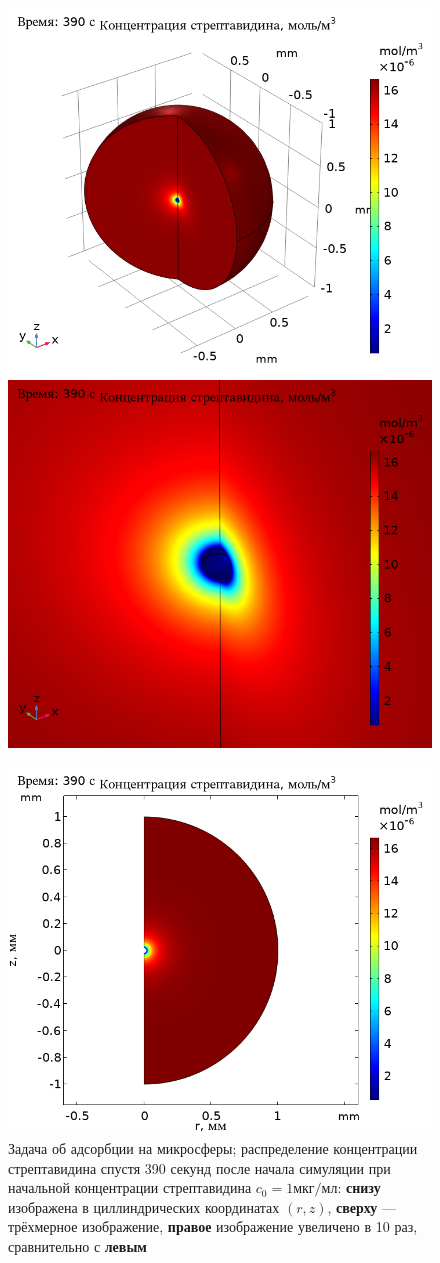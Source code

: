 \documentclass[oneside,final,12pt]{extreport}
\begin{document}
\begin{figure}
  \centering
  \includegraphics[width=.5\textwidth]{pic/sphere_stationary_dil100_390s_3d}%
  \includegraphics[width=.5\textwidth]{pic/sphere_stationary_dil100_390s_3d_close}

  \includegraphics[width=.6\textwidth]{pic/sphere_stationary_dil100_390s_2d}
  
  \caption{%
    \label{fig:sphere_stationary_concentrations}%
    Задача об адсорбции на микросферы;
    распределение концентрации стрептавидина
    спустя 390 секунд после начала симуляции
    при начальной концентрации стрептавидина $c_0 = 1\text{мкг}/\text{мл}$:
    \textbf{снизу} изображена в циллиндрических координатах $\left(r,z\right)$,
    \textbf{сверху} --- трёхмерное изображение,
    \textbf{правое} изображение увеличено в 10 раз, сравнительно с \textbf{левым}
  }

\end{figure}
\end{document}
